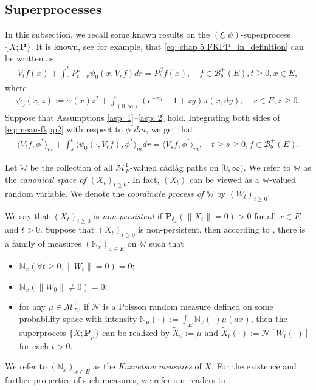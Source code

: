 \documentclass[UTF8]{pkuthss}
\theoremstyle{plain}
\theoremstyle{definition}
\numberwithin{equation}{section}
\begin{document}
\subsection{Superprocesses} \label{sec: Superprocesses}
	In this subsection, we recall some known results on the $(\xi, \psi)$-superprocess $\{X; \mathbf P\}$.
	It is known, see \cite[Theorem 2.23]{Li2011MeasureValued} for example, that \eqref{eq: chap 5 FKPP_in_definition} can be written as
\begin{align}\label{eq:mean-fkpp2}
	V_t f(x) + \int_0^t P^\beta_{t-r} \psi_0(x,V_r f) dr
	= P^\beta_t f(x),
	\quad f \in \mathscr B^+_b(E), t \geq 0,x \in E,
\end{align}
	where
\begin{align}
	\psi_0(x,z)
	:= \alpha(x) z^2 + \int_{(0,\infty)} (e^{-z y} - 1 + z y) \pi(x,dy),
	\quad x \in E,z \geq 0.
\end{align}
    Suppose that Assumptions \ref{asp: 1}--\ref{asp: 2} hold.
    Integrating both sides of \eqref{eq:mean-fkpp2}  with respect to  $\phi^*dm$, we get that
\begin{align}\label{eq:langleVtfphiranglem_equation}
	\langle V_tf,\phi^*\rangle_m + \int_s^t \langle \psi_0(\cdot ,V_r f) , \phi^*\rangle_mdr
	= \langle V_sf,\phi^*\rangle_m,
	\quad t\geq s\geq 0, f\in \mathscr B^+_b(E).
\end{align}

	Let $\mathbb W$ be the collection of all $\mathcal M^1_E$-valued c\`{a}dl\`{a}g paths on $[0,\infty)$.
	We refer to $\mathbb W$ as the \emph{canonical space of $(X_t)_{t\geq 0}$}.
	In fact, $(X_t)$ can be viewed as a $\mathbb W$-valued random variable.
	We denote the \emph{coordinate process of $\mathbb W$} by $(W_t)_{t\geq 0}$.

	We say that $(X_t)_{t\geq 0}$ is \emph{non-persistent} if $\mathbf P_{\delta_x}(\|X_t\|= 0) > 0$ for all $x\in E$ and $t> 0$.
	Suppose that $(X_t)_{t\geq 0}$ is non-persistent,
	then according to \cite[Section 8.4]{Li2011MeasureValued},
	there is a family of measures $(\mathbb N_x)_{x\in E}$ on $\mathbb W$ such that
\begin{itemize}
\item
	$\mathbb N_x (\forall t \geq 0, \|W_t\|=0) =0$;
\item
	$\mathbb N_x(\|W_0 \|\neq 0) = 0$;
\item
	for any $\mu \in \mathcal M_E^1$, if $\mathcal N$ is a Poisson random measure defined on some probability space
	with intensity $\mathbb N_\mu(\cdot):= \int_E \mathbb N_x(\cdot )\mu(dx)$,
	then the superprocess $\{X;\mathbf P_\mu\}$ can be realized by $\widetilde X_0 := \mu$ and $\widetilde X_t(\cdot) := \mathcal N[W_t(\cdot)]$ for each $t>0$.
\end{itemize}
	We refer to $(\mathbb N_x)_{x\in E}$ as the \emph{Kuznetsov measures} of $X$.
	For the existence and further properties of such measures, we refer our readers to \cite{Li2011MeasureValued}.
\end{document}

